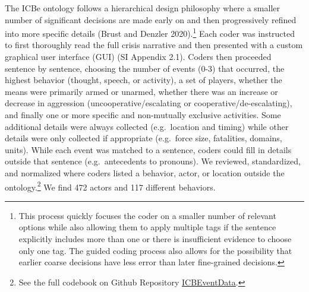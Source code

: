 \documentclass{article}
\begin{document}
The ICBe ontology follows a hierarchical design philosophy where a
smaller number of significant decisions are made early on and then
progressively refined into more specific details (Brust and Denzler
2020).\footnote{This process quickly focuses the coder on a smaller
  number of relevant options while also allowing them to apply multiple
  tags if the sentence explicitly includes more than one or there is
  insufficient evidence to choose only one tag. The guided coding
  process also allows for the possibility that earlier coarse decisions
  have less error than later fine-grained decisions.} Each coder was
instructed to first thoroughly read the full crisis narrative and then
presented with a custom graphical user interface (GUI) (SI Appendix
2.1). Coders then proceeded sentence by sentence, choosing the number of
events (0-3) that occurred, the highest behavior (thought, speech, or
activity), a set of players, whether the means were primarily armed or
unarmed, whether there was an increase or decrease in aggression
(uncooperative/escalating or cooperative/de-escalating), and finally one
or more specific and non-mutually exclusive activities. Some additional
details were always collected (e.g.~location and timing) while other
details were only collected if appropriate (e.g.~force size, fatalities,
domains, units). While each event was matched to a sentence, coders
could fill in details outside that sentence (e.g.~antecedents to
pronouns). We reviewed, standardized, and normalized where coders listed
a behavior, actor, or location outside the ontology.\footnote{See the
  full codebook on Github Repository
  \href{https://urldefense.com/v3/__https://github.com/CenterForPeaceAndSecurityStudies/ICBEventData__;!!Mih3wA!WxDJtEczKfxGTh0S2Krunap8ReymFEL5iTWaSfOHeqlSdyfRx77zmjBSWO1OAm13$}{ICBEventData}.}
We find 472 actors and 117 different behaviors.
\end{document}
